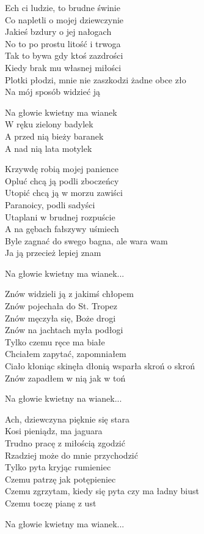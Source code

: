 \begin{text}
    Ech ci ludzie, to brudne świnie\\    
    Co napletli o mojej dziewczynie\\
    Jakieś bzdury o jej nałogach\\
    No to po prostu litość i trwoga\\ 
    Tak to bywa gdy ktoś zazdrości\\
    Kiedy brak mu własnej miłości\\
    Plotki płodzi, mnie nie zaszkodzi żadne obce zło\\
    Na mój sposób widzieć ją 

    \vin Na głowie kwietny ma wianek\\
    \vin W ręku zielony badylek\\
    \vin A przed nią bieży baranek\\
    \vin A nad nią lata motylek

    Krzywdę robią mojej panience\\
    Opluć chcą ją podli zboczeńcy\\
    Utopić chcą ją w morzu zawiści\\
    Paranoicy, podli sadyści\\
    Utaplani w brudnej rozpuście\\
    A na gębach fałszywy uśmiech\\
    Byle zagnać do swego bagna, ale wara wam\\
    Ja ją przecież lepiej znam

    \vin Na głowie kwietny ma wianek...

    Znów widzieli ją z jakimś chłopem\\
    Znów pojechała do St. Tropez\\
    Znów męczyła się, Boże drogi\\
    Znów na jachtach myła podłogi\\
    Tylko czemu ręce ma białe\\
    Chciałem zapytać, zapomniałem\\
    Ciało kłoniąc skinęła dłonią wsparła skroń o skroń\\
    Znów zapadłem w nią jak w toń 

    \vin Na głowie kwietny na wianek...

    Ach, dziewczyna pięknie się stara\\
    Kosi pieniądz, ma jaguara\\
    Trudno pracę z miłością zgodzić\\
    Rzadziej może do mnie przychodzić\\
    Tylko pyta kryjąc rumieniec\\
    Czemu patrzę jak potępieniec\\
    Czemu zgrzytam, kiedy się pyta czy ma ładny biust\\
    Czemu toczę pianę z ust

    \vin Na głowie kwietny ma wianek...

\end{text}
